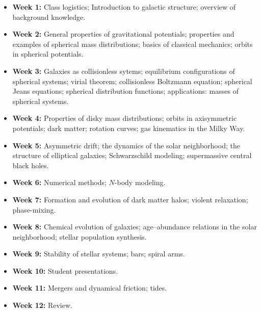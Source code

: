\documentclass{article}
\begin{document}
\begin{itemize}

  \item {\bf Week 1:} Class logistics; Introduction to galactic
 structure; overview of background knowledge.

  \item {\bf Week 2:} General properties of gravitational potentials;
    properties and examples of spherical mass distributions; basics of
    classical mechanics; orbits in spherical potentials.

  \item {\bf Week 3:} Galaxies as collisionless sytems; equilibrium
    configurations of spherical systems; virial theorem; collisionless
    Boltzmann equation; spherical Jeans equations; spherical
    distribution functions; applications: masses of spherical systems.

  \item {\bf Week 4:} Properties of disky mass distributions; orbits
    in axisymmetric potentials; dark matter; rotation curves; gas
    kinematics in the Milky Way.

  \item {\bf Week 5:} Asymmetric drift; the dynamics of the solar
    neighborhood; the structure of elliptical galaxies; Schwarzschild modeling; 
    supermassive central black holes.

  \item {\bf Week 6:} Numerical methods; $N$-body modeling.

  \item {\bf Week 7:} Formation and evolution of dark matter halos;
    violent relaxation; phase-mixing.

  \item {\bf Week 8:} Chemical evolution of galaxies; age--abundance
    relations in the solar neighborhood; stellar population synthesis.

  \item {\bf Week 9:} Stability of stellar systems; bars; spiral arms.

  \item {\bf Week 10:} Student presentations.

  \item {\bf Week 11:} Mergers and dynamical friction; tides.

  \item {\bf Week 12:} Review.

\end{itemize}
\end{document}
